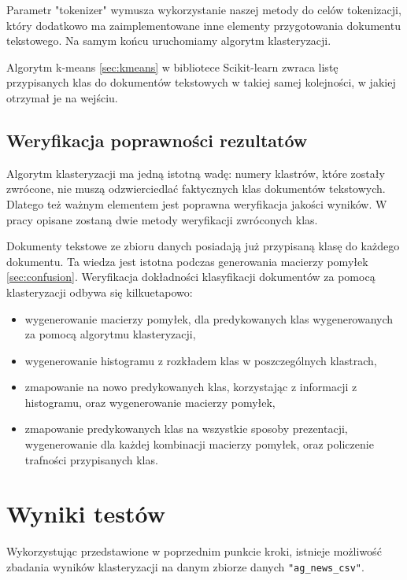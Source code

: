     
    
    Parametr "tokenizer" wymusza wykorzystanie naszej metody do celów tokenizacji, który dodatkowo ma zaimplementowane inne elementy przygotowania dokumentu tekstowego. Na samym końcu uruchomiamy algorytm klasteryzacji.
    
    
    Algorytm k-means \ref{sec:kmeans} w bibliotece Scikit-learn zwraca listę przypisanych klas do dokumentów tekstowych w takiej samej kolejności, w jakiej otrzymał je na wejściu.
    
    \subsection{Weryfikacja poprawności rezultatów}
    Algorytm klasteryzacji ma jedną istotną wadę: numery klastrów, które zostały zwrócone, nie muszą odzwierciedlać faktycznych klas dokumentów tekstowych. Dlatego też ważnym elementem jest poprawna weryfikacja jakości wyników. W pracy opisane zostaną dwie metody weryfikacji zwróconych klas. 
    
    Dokumenty tekstowe ze zbioru danych posiadają już przypisaną klasę do każdego dokumentu. Ta wiedza jest istotna podczas generowania macierzy pomyłek \ref{sec:confusion}. Weryfikacja dokładności klasyfikacji dokumentów za pomocą klasteryzacji odbywa się kilkuetapowo:
    
    \begin{itemize}
        \item wygenerowanie macierzy pomyłek, dla predykowanych klas wygenerowanych za pomocą algorytmu klasteryzacji,
        \item wygenerowanie histogramu z rozkładem klas w poszczególnych klastrach,
        \item zmapowanie na nowo predykowanych klas, korzystając z informacji z histogramu, oraz wygenerowanie macierzy pomyłek,
        \item zmapowanie predykowanych klas na wszystkie sposoby prezentacji, wygenerowanie dla każdej kombinacji macierzy pomyłek, oraz policzenie trafności przypisanych klas.
    \end{itemize}
\newpage
\section{Wyniki testów}
    Wykorzystując przedstawione w poprzednim punkcie kroki, istnieje możliwość zbadania wyników klasteryzacji na danym zbiorze danych \texttt{"ag\_news\_csv"}. 
    
